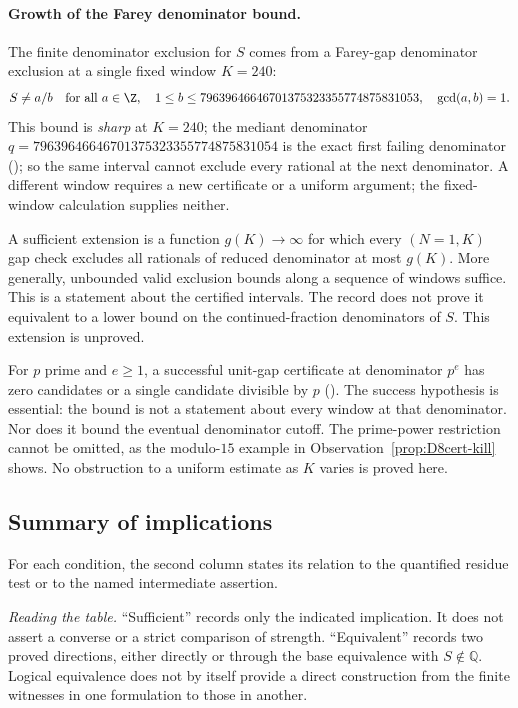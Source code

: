 \paragraph{Growth of the Farey denominator bound.}
The finite denominator exclusion for $S$ comes from
a Farey-gap denominator exclusion at a single fixed window $K=240$:
\[
 S\ne a/b\quad\text{for all }a\in\Z,\quad
 1\le b\le79639646646701375323355774875831053,
 \quad\gcd(a,b)=1.
\]
This bound is
\emph{sharp} at $K=240$; the mediant denominator
$q=79639646646701375323355774875831054$ is the exact first failing
denominator
(); so the same interval cannot exclude every rational at the next
denominator. A different window requires a new certificate or a
uniform argument; the fixed-window calculation supplies neither.


A sufficient extension is a function $g(K)\to\infty$ for which every
$(N=1,K)$ gap check excludes all rationals of reduced denominator
at most $g(K)$. More generally, unbounded valid exclusion bounds
along a sequence of windows suffice. This is a statement about the
certified intervals. The record does not prove it equivalent to a
lower bound on the continued-fraction denominators of $S$.
This extension is unproved.

For $p$ prime and $e\ge1$, a successful unit-gap certificate at
denominator $p^e$ has zero candidates or a single candidate divisible
by $p$ ().
The success hypothesis is essential: the bound is
not a statement about every window at that denominator. Nor does it
bound the eventual denominator cutoff. The prime-power restriction
cannot be omitted, as the modulo-$15$ example in
Observation~\ref{prop:D8cert-kill} shows. No obstruction to a uniform
estimate as $K$ varies is proved here.

\subsection{Summary of implications}

For each condition, the second column states its relation to the
quantified residue test or to the named intermediate assertion.

\emph{Reading the table.} ``Sufficient'' records only the indicated
implication. It does not assert a converse or a strict comparison of
strength. ``Equivalent'' records two proved directions, either directly
or through the base equivalence with $S\notin\mathbb Q$. Logical
equivalence does not by itself provide a direct construction from the
finite witnesses in one formulation to those in another.

